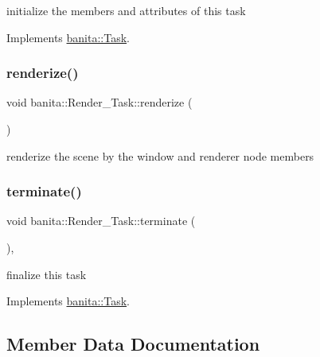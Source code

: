 initialize the members and attributes of this task 



Implements \mbox{\hyperlink{classbanita_1_1_task_a34578cdd41899a338ac09fec3a285487}{banita\+::\+Task}}.

\mbox{\label{classbanita_1_1_render___task_af909021398c0b93207f2502d172138bf}} 
\subsubsection{\texorpdfstring{renderize()}{renderize()}}
{\footnotesize\ttfamily void banita\+::\+Render\+\_\+\+Task\+::renderize (\begin{DoxyParamCaption}{ }\end{DoxyParamCaption})}



renderize the scene by the window and renderer node members 

\mbox{\label{classbanita_1_1_render___task_a7518f53ea9050d2312f02ba0389188c6}} 
\subsubsection{\texorpdfstring{terminate()}{terminate()}}
{\footnotesize\ttfamily void banita\+::\+Render\+\_\+\+Task\+::terminate (\begin{DoxyParamCaption}{ }\end{DoxyParamCaption})\hspace{0.3cm}{\ttfamily [override]}, {\ttfamily [virtual]}}



finalize this task 



Implements \mbox{\hyperlink{classbanita_1_1_task_acccbd449402b1e9ce1ba34c26333a1b6}{banita\+::\+Task}}.



\subsection{Member Data Documentation}
\mbox{\label{classbanita_1_1_render___task_ac90f3e16c8bafe5644de67226231a8ab}} 
